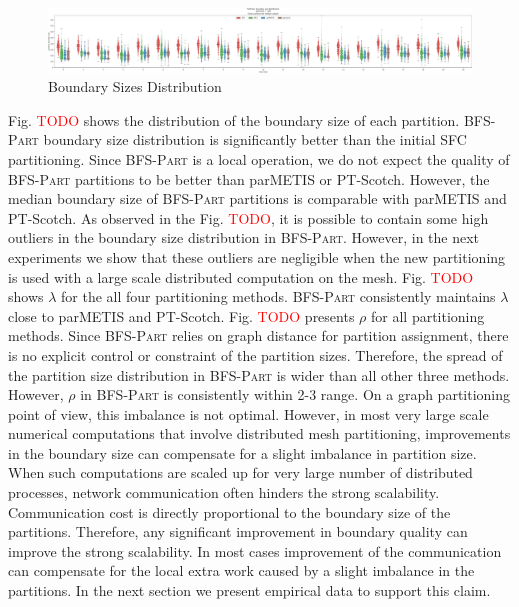 \documentclass[conference]{IEEEtran}
\newcommand{\bfspart}{\textsc{BFS-Part}\xspace}
\begin{document}
\begin{figure}[htbp]
    \centering
    \includegraphics[width=\textwidth]{figures/boundary-sizes.pdf}
    \caption{Boundary Sizes Distribution}
    \label{fig:bdry-sizes}
\end{figure}



Fig. \textcolor{red}{TODO} shows the distribution of the boundary size of each partition. \bfspart boundary size distribution is significantly better than the initial SFC partitioning. Since \bfspart is a local operation, we do not expect the quality of \bfspart partitions to be better than parMETIS or PT-Scotch. However, the median boundary size of \bfspart partitions is comparable with parMETIS and PT-Scotch. As observed in the Fig. \textcolor{red}{TODO}, it is possible to contain some high outliers in the boundary size distribution in \bfspart. However, in the next experiments we show that these outliers are negligible when the new partitioning is used with a large scale distributed computation on the mesh. Fig. \textcolor{red}{TODO} shows $\lambda$ for the all four partitioning methods. \bfspart consistently maintains $\lambda$ close to parMETIS and PT-Scotch. Fig. \textcolor{red}{TODO} presents $\rho$ for all partitioning methods. Since \bfspart relies on graph distance for partition assignment, there is no explicit control or constraint of the partition sizes. Therefore, the spread of the partition size distribution in \bfspart is wider than all other three methods. However, $\rho$ in \bfspart is consistently within 2-3 range. On a graph partitioning point of view, this imbalance is not optimal. However, in most very large scale numerical computations that involve distributed mesh partitioning, improvements in the boundary size can compensate for a slight imbalance in partition size. When such computations are scaled up for very large number of distributed processes, network communication often hinders the strong scalability. Communication cost is directly proportional to the boundary size of the partitions. Therefore, any significant improvement in boundary quality can improve the strong scalability. In most cases improvement of the communication can compensate for the local extra work caused by a slight imbalance in the partitions. In the next section we present empirical data to support this claim.
\end{document}
